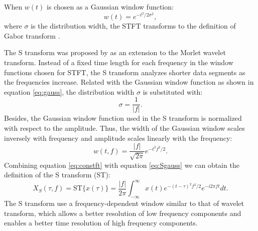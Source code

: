 When $w(t)$ is chosen as a Gaussian window function:
\begin{equation}
\label{eq:gauss}
w(t)=e^{-t^2/2\sigma^2},
\end{equation}
where $\sigma$ is the distribution width, the STFT transforms to the definition of Gabor transform \cite[]{carmona1998}.

The S transform was proposed by \cite{stockwell1996} as an extension to the Morlet wavelet transform. Instead of a fixed time length for each frequency in the window functions chosen for STFT, the S transform analyzes shorter data segments as the frequencies increase. Related with the Gaussian window function as shown in equation \ref{eq:gauss}, the distribution width $\sigma$ is substituted with:
\begin{equation}
\label{eq:inversesigma}
\sigma=\frac{1}{|f|}.
\end{equation}
Besides, the Gaussian window function used in the S transform is normalized with respect to the amplitude. Thus, the width of the Gaussian window scales inversely with frequency and amplitude scales linearly with the frequency:
\begin{equation}
\label{eq:Sgauss}
w(t,f)=\frac{|f|}{\sqrt{2\pi}}e^{-t^2f^2/2}.
\end{equation}
Combining equation \ref{eq:constft} with equation \ref{eq:Sgauss} we can obtain the definition of the S transform (ST):
\begin{equation}
\label{eq:strans}
X_S(\tau,f)=\text{ST}\{x(\tau)\}=\frac{|f|}{2\pi}\int_{-\infty}^{\infty}x(t)e^{-(t-\tau)^2f^2/2}e^{-i2\pi ft}dt.
\end{equation}
The S transform use a frequency-dependent window similar to that of wavelet transform, which allows a better resolution of low frequency components and enables a better time resolution of high frequency components.






\newpage
\listoffigures
\newpage



